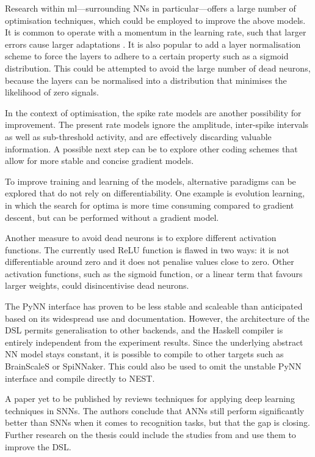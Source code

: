 \documentclass[report.tex]{subfiles}
\begin{document}
Research within \gls{ml}---surrounding \glspl{NN} in particular---offers a large
number of optimisation techniques, which could be employed to improve the above
models.
It is common to operate with a momentum in the learning rate, such that
larger errors cause larger adaptations \cite{Montavon1998, Sutskever2013}.
It is also popular to add a layer normalisation scheme to force the layers to
adhere to a certain property such as a sigmoid distribution.
This could be attempted to avoid the large number of dead neurons, because the
layers can be normalised into a distribution that minimises the likelihood of
zero signals.

In the context of optimisation, the spike rate models are another possibility
for improvement.
The present rate models ignore the amplitude, inter-spike intervals as well as
sub-threshold activity, and are effectively discarding valuable information.
A possible next step can be to explore other coding schemes that
allow for more stable and concise gradient models.

To improve training and learning of the models, alternative paradigms can be explored that do not
rely on differentiability. 
One example is evolution learning, in which the search for optima is more time 
consuming compared to gradient descent, but can be performed without a gradient model.

Another measure to avoid dead neurons is to explore different activation functions. 
The currently used ReLU function is flawed in two ways: it is not
differentiable around zero and it does not penalise values close to
zero.
Other activation functions, such as the sigmoid function, or a linear term
that favours larger weights, could disincentivise dead neurons.

The PyNN interface has proven to be less stable and scaleable than anticipated
based on its widespread use and documentation.
However, the architecture of the \gls{DSL} permits generalisation to other
backends, and the Haskell compiler is entirely independent from the experiment
results.
Since the underlying abstract \gls{NN} model stays constant, 
it is possible to compile to other targets such as BrainScaleS or
SpiNNaker.
This could also be used to omit the unstable PyNN interface and compile directly
to NEST.

A paper yet to be published by \citeauthor{Tavanaei2019} reviews
techniques for applying deep learning techniques in \glspl{SNN}.
The authors conclude that \glspl{ANN} still perform significantly better than
\glspl{SNN} when it comes to recognition tasks, but that the gap is closing.
Further research on the thesis could include the studies from
\citeauthor{Tavanaei2019} and use them to improve the \gls{DSL}.
\\[0.1cm]
\end{document}
